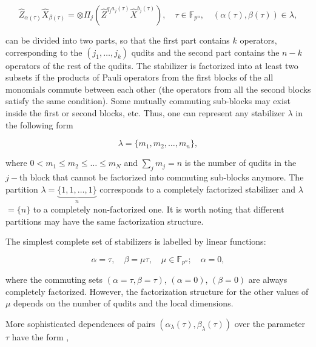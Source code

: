 \documentclass[quantumrep,article,submit,pdftex,moreauthors]{Definitions/mdpi}
\providecommand{\DIFadd}[1]{{\protect\color{blue}\uwave{#1}}} %
\providecommand{\DIFdel}[1]{{\protect\color{red}\sout{#1}}}                      %
\providecommand{\DIFaddbegin}{} %
\providecommand{\DIFaddend}{} %
\providecommand{\DIFdelbegin}{} %
\providecommand{\DIFdelend}{} %
\begin{document}
\begin{equation*}
  \hat{Z}_{\alpha(\tau)}\hat{X}_{\beta(\tau)}
  = \otimes \Pi_{j} \left(
    \hat{Z}^{q_{j}a_{j}(\tau)}\hat{X}^{b_{j}(\tau)}
  \right),
  \quad \tau \in \mathbb{F}_{p^{n}},
  \quad \left(\alpha(\tau),\beta(\tau)\right) \in \lambda,
\end{equation*}

can be divided into two parts, so that the first part contains $k$ operators,
corresponding to the $(j_{1},\ldots ,j_{k})$ qudits and the second part contains
the $n-k$ operators of the rest of the qudits. The stabilizer is factorized into
at least two subsets if the products of Pauli operators from the first blocks of
the all monomials commute between each other (the operators from all the second
blocks satisfy the same condition).  Some mutually commuting sub-blocks may
exist inside the first or second blocks, etc. Thus, one can represent any
stabilizer $\lambda $ in the following form

\begin{equation}
  \lambda = \{m_{1}, m_{2}, \ldots, m_{n}\},
  \label{curve_part}
\end{equation}

where $0<m_{1}\leq m_{2}\leq \ldots \leq m_{N}$ and $\sum_{j}m_{j}=n$ is the
number of qudits in the $j-$th block that cannot be factorized into commuting
sub-blocks anymore. The partition $\lambda =\underbrace{\{1,1,\ldots ,1\}}_{n}$
corresponds to a completely factorized stabilizer and $\lambda $ $=\{n\}$ to a
completely non-factorized one. It is worth noting that different partitions may
have the same factorization structure.

The simplest complete set of stabilizers is labelled by linear functions:

\begin{equation}
  \alpha = \tau, \quad \beta = \mu \tau, \quad \mu \in \mathbb{F}_{p^{n}};
  \quad \alpha = 0,
  \label{rays}
\end{equation}

where the commuting sets $\left(\alpha = \tau, \beta = \tau \right)$,
\DIFdelbegin \DIFdel{$\left(
\alpha = 0\right)$}\DIFdelend \DIFaddbegin \DIFadd{$\left(\alpha = 0\right)$}\DIFaddend , $\left(\beta = 0\right)$ are always completely
factorized.  However, the factorization structure for the other values of $\mu$
depends on the number of qudits and the local dimensions.

More sophisticated dependences of pairs
$\left(\alpha_{\lambda}(\tau),\beta_{\lambda }(\tau)\right)$ over the parameter
$\tau$ have the form \cite{GS2,JPA09},
\end{document}
